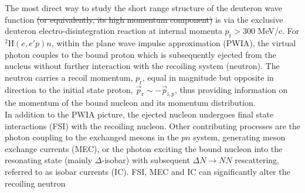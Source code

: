 \documentclass[aps,prl,twocolumn,showpacs,superscriptaddress,groupedaddress]{revtex4-2}  %
\providecommand{\DIFdeltex}[1]{{\protect\color{red}\sout{#1}}}                      %
\providecommand{\DIFdelbegin}{} %
\providecommand{\DIFdelend}{} %
\providecommand{\DIFdel}[1]{\texorpdfstring{\DIFdeltex{#1}}{}} %
\newcommand{\DIFscaledelfig}{0.5}
\newlength{\DIFdelgraphicswidth} %
\newlength{\DIFdelgraphicsheight} %
\newcommand{\DIFdelincludegraphics}[2][]{%
\sbox{\DIFdelgraphicsbox}{\DIFOincludegraphics[#1]{#2}}%
\settoboxwidth{\DIFdelgraphicswidth}{\DIFdelgraphicsbox} %
\settoboxtotalheight{\DIFdelgraphicsheight}{\DIFdelgraphicsbox} %
\scalebox{\DIFscaledelfig}{%
\parbox[b]{\DIFdelgraphicswidth}{\usebox{\DIFdelgraphicsbox}\\[-\baselineskip] \rule{\DIFdelgraphicswidth}{0em}}\llap{\resizebox{\DIFdelgraphicswidth}{\DIFdelgraphicsheight}{%
\setlength{\unitlength}{\DIFdelgraphicswidth}%
\begin{picture}(1,1)%
\thicklines\linethickness{2pt} %
{\color[rgb]{1,0,0}\put(0,0){\framebox(1,1){}}}%
{\color[rgb]{1,0,0}\put(0,0){\line( 1,1){1}}}%
{\color[rgb]{1,0,0}\put(0,1){\line(1,-1){1}}}%
\end{picture}%
}\hspace*{3pt}}} %
} %
\DeclareRobustCommand{\DIFdelbegin}{\DIFOdelbegin \let\includegraphics\DIFdelincludegraphics} %
\DeclareRobustCommand{\DIFdelend}{\DIFOaddend \let\includegraphics\DIFOincludegraphics} %
\begin{document}
\indent The most direct way to study the short range structure of the deuteron wave function \DIFdelbegin \DIFdel{(or equivalently, its high momentum component) }\DIFdelend %
is via the exclusive deuteron electro-disintegration reaction at internal momenta $p_{\mathrm{r}}>300$ MeV/c. For $^{2}\mathrm{H}(e,e'p)n$, within the plane wave impulse approximation (PWIA),
the virtual photon couples to the bound proton which is subsequently ejected from the nucleus without further interaction with the recoiling system (neutron). The neutron carries a recoil
momentum, $p_{\mathrm{r}}$, equal in magnitude but opposite in direction to the initial state proton, $\vec{p}_{\mathrm{r}} \sim -\vec{p}_{\mathrm{i},p}$, thus providing information on the momentum
of the bound nucleon and its momentum distribution.\\
\indent In addition to the PWIA picture, the ejected nucleon undergoes final state interactions (FSI) with the recoiling nucleon. Other contributing processes are
the photon coupling to the exchanged mesons in the $pn$ system, generating meson exchange currents (MEC), or the photon exciting the bound nucleon into the
resonating state (mainly $\Delta$-isobar) with subsequent $\Delta N \to NN$ rescattering, referred to as isobar currents (IC). FSI, MEC and IC can significantly alter the recoiling neutron
\end{document}
